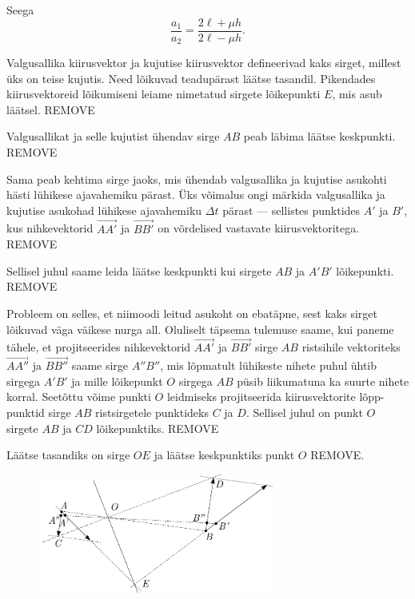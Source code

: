 \documentclass[10pt]{article}
\newcommand{\pp}[1]{REMOVE}
\begin{document}
Seega
\begin{equation}
\frac{a_1}{a_2}= \frac{2\ell + \mu h}{2\ell - \mu h}.
\end{equation}
\probend
\bigskip


\solu
Valgusallika kiirusvektor ja kujutise kiirusvektor defineerivad kaks sirget, millest üks on teise kujutis. Need lõikuvad teadupärast läätse tasandil. Pikendades kiirusvektoreid lõikumiseni leiame nimetatud sirgete lõikepunkti $E$, mis asub läätsel. \pp3 \par
Valgusallikat ja selle kujutist ühendav sirge $AB$ peab läbima läätse keskpunkti. \pp1 \par
Sama peab kehtima sirge jaoks, mis ühendab valgusallika ja kujutise asukohti hästi lühikese ajavahemiku pärast. Üks võimalus ongi märkida valgusallika ja kujutise asukohad lühikese ajavahemiku $\Delta t$ pärast --- sellistes punktides $A'$ ja $B'$, kus nihkevektorid  $\vec{AA'}$ ja $\vec{BB'}$ on võrdelised vastavate kiirusvektoritega. \pp3 \par
Sellisel juhul saame leida läätse keskpunkti kui sirgete $AB$ ja $A'B'$ lõikepunkti. \pp2 \par
Probleem on selles, et niimoodi leitud asukoht on ebatäpne, sest kaks sirget lõikuvad väga väikese nurga all. Oluliselt täpsema tulemuse saame, kui paneme tähele, et projitseerides nihkevektorid $\vec{AA'}$ ja $\vec{BB'}$ sirge $AB$ ristsihile vektoriteks $\vec{AA''}$ ja $\vec{BB''}$ saame sirge $A''B''$, mis  lõpmatult lühikeste nihete puhul ühtib sirgega $A'B'$ ja mille lõikepunkt $O$ sirgega $AB$ püsib liikumatuna ka suurte nihete korral. Seetõttu võime punkti $O$ leidmiseks projitseerida kiirusvektorite lõpp-punktid sirge $AB$ ristsirgetele punktideks $C$ ja $D$. Sellisel juhul on punkt $O$ sirgete $AB$ ja $CD$ lõikepunktiks. \pp2 \par
Läätse tasandiks on sirge $OE$ ja läätse keskpunktiks punkt $O$ \pp1.
\begin{figure}[H]
  \centering
  \includegraphics[width=0.69\textwidth]{2021-v2g-09-yl.pdf}
\end{figure}
\end{document}
